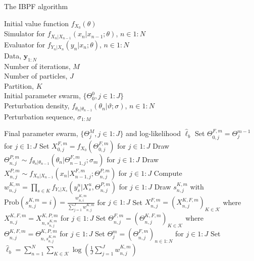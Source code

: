\documentclass{article}
\begin{document}
\begin{algorithm}
\caption{The IBPF algorithm}
\begin{algorithmic}[1]
\REQUIRE Initial value function $f_{X_0}(\theta)$ \\
Simulator for $f_{X_n|X_{n-1}}(x_n | x_{n-1}; \theta)$, $n \in 1:N$ \\
Evaluator for $f_{Y_n|X_n}(y_n | x_n; \theta)$, $n \in 1:N$ \\
Data, $\mathbf{y}_{1:N}$ \\
Number of iterations, $M$ \\
Number of particles, $J$ \\
Partition, $K$ \\
Initial parameter swarm, $\{\Theta_0^0, j \in 1:J\}$ \\
Perturbation density, $f_{\theta_n|\theta_{n-1}}(\theta_n | \vartheta; \sigma)$, $n \in 1:N$ \\
Perturbation sequence, $\sigma_{1:M}$

\ENSURE Final parameter swarm, $\{\Theta_j^M, j \in 1:J\}$ and log-likelihood $\hat{\ell}_b$
    \STATE Set $\Theta_{0,j}^{F,m} = \Theta_{j}^{m-1}$ for $j \in 1:J$
    \STATE Set $X_{0,j}^{F,m} = f_{X_0}(\Theta_{0,j}^{F,m})$ for $j \in 1:J$
        \STATE Draw $\Theta_{n,j}^{P,m} \sim f_{\theta_n|\theta_{n-1}}(\theta_n | \Theta_{n-1,j}^{F,m}; \sigma_m)$ for $j \in 1:J$
        \STATE Draw $X_{n,j}^{P,m} \sim f_{X_n|X_{n-1}}(x_n | X_{n-1,j}^{F,m}; \Theta_{n,j}^{P,m})$ for $j \in 1:J$
            \STATE Compute $w_{n,j}^{K,m} = \prod_{s \in K} f_{Y_s|X_s}(y_s^u | X_s^u, \Theta_{n,j}^{P,m})$ for $j \in 1:J$
            \STATE Draw $s_{n,j}^{K,m}$ with $\text{Prob}(s_{n,j}^{K,m} = i) = \frac{w_{n,i}^{K,m}}{\sum_{j=1}^J w_{n,j}^{K,m}}$ for $j \in 1:J$
        \ENDFOR
        \STATE Set $X_{n,j}^{F,m} = (X_{n,j}^{K,F,m})_{K \in \mathcal{K}}$ where $X_{n,j}^{K,F,m} = X_{n,s_{n,j}^{K,m}}^{K,P,m}$ for $j \in 1:J$
        \STATE Set $\Theta_{n,j}^{F,m} = (\Theta_{n,j}^{K,F,m})_{K \in \mathcal{K}}$ where $\Theta_{n,j}^{K,F,m} = \Theta_{n,s_{n,j}^{K,m}}^{K,P,m}$ for $j \in 1:J$
    \ENDFOR
    \STATE Set $\Theta_{j}^{m} = (\Theta_{n,j}^{F,m})_{n \in 1:N}$ for $j \in 1:J$
\ENDFOR
\STATE Set $\hat{\ell}_b = \sum_{n=1}^N \sum_{K \in \mathcal{K}} \log \left( \frac{1}{J} \sum_{j=1}^J w_{n,j}^{K,m} \right)$
\end{algorithmic}
\end{algorithm}
\end{document}
